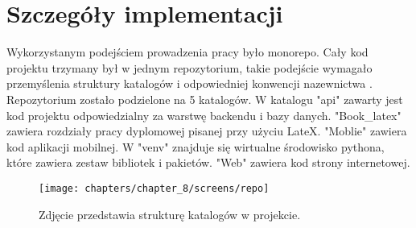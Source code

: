 

\section{Szczegóły implementacji}

Wykorzystanym podejściem prowadzenia pracy było monorepo. Cały kod projektu trzymany był w jednym repozytorium, takie podejście wymagało przemyślenia struktury katalogów i odpowiedniej konwencji nazewnictwa \cite{monorepo}. Repozytorium zostało podzielone na 5 katalogów. W katalogu "api" zawarty jest kod projektu odpowiedzialny za warstwę backendu i bazy danych. "Book\_latex" zawiera rozdziały pracy dyplomowej pisanej przy użyciu LateX. "Moblie" zawiera kod aplikacji mobilnej. W "venv" znajduje się wirtualne środowisko pythona, które zawiera zestaw bibliotek i pakietów. "Web" zawiera kod strony internetowej.


\begin{figure}[H]
    \centering
    \texttt{[image: chapters/chapter\_8/screens/repo]}
    \caption{Zdjęcie przedstawia strukturę katalogów w projekcie.}
    \label{img:repo}
\end{figure}
















